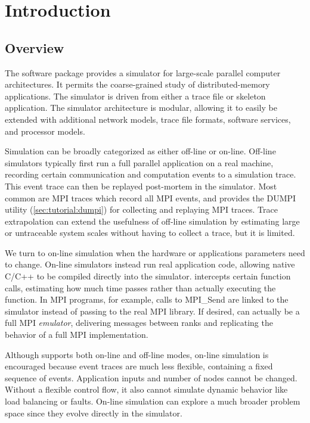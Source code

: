 
\chapter{Introduction}
\label{sec:intro}

\section{Overview}
\label{sec:intro:overview}

The \sstmacro software package provides a simulator for large-scale parallel computer architectures. 
It permits the coarse-grained study of distributed-memory applications. 
The simulator is driven from either a trace file or skeleton application. 
The simulator architecture is modular, allowing it to easily be extended with additional network models, 
trace file formats, software services, and processor models.

Simulation can be broadly categorized as either off-line or on-line.
Off-line simulators typically first run a full parallel application on a real machine,
recording certain communication and computation events to a simulation trace.
This event trace can then be replayed post-mortem in the simulator.
Most common are MPI traces which record all MPI events, and
\sstmacro provides the DUMPI utility (\ref{sec:tutorial:dumpi}) for collecting and replaying MPI traces. 
Trace extrapolation can extend the usefulness of off-line simulation by estimating large or untraceable system scales without   
having to collect a trace, but it is limited.

We turn to on-line simulation when the hardware or applications parameters need to change.
On-line simulators instead run real application code, allowing native C/C++ to be compiled directly into the simulator.
\sstmacro intercepts certain function calls, estimating how much time passes rather than actually executing the function.
In MPI programs, for example, calls to MPI\_Send are linked to the simulator instead of passing to the real MPI library.
If desired, \sstmacro can actually be a full MPI \emph{emulator}, delivering messages between ranks and replicating the behavior of a full MPI implementation.

Although \sstmacro supports both on-line and off-line modes, on-line simulation is encouraged because
event traces are much less flexible, containing a fixed sequence of events.
Application inputs and number of nodes cannot be changed. 
Without a flexible control flow, it also cannot simulate dynamic behavior like load balancing or faults.
On-line simulation can explore a much broader problem space since they evolve directly in the simulator.

